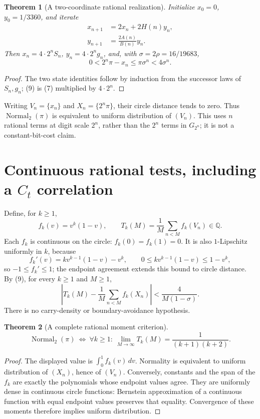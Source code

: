 \documentclass[10pt,a4paper]{article}
\newtheorem{theorem}{Theorem}[section]
\newcommand{\Q}{\mathbb Q}\newcommand{\R}{\mathbb R}
\newcommand{\fracp}[1]{\{#1\}}
\newcommand{\Normal}{\operatorname{Normal}_2}
\newcommand{\av}[2]{\frac1{#1}\sum_{n<#1}#2}
\begin{document}
\begin{theorem}[A two-coordinate rational realization]
Initialize $x_0=0$, $y_0=1/3360$, and iterate
\[
 \boxed{\begin{aligned}
 x_{n+1}&=2x_n+2H(n)y_n,\\
 y_{n+1}&=\frac{2A(n)}{B(n)}y_n.
 \end{aligned}}                                               \tag{8}
\]
Then $x_n=4\cdot2^nS_n$, $y_n=4\cdot2^ng_n$, and, with
$\sigma=2\rho=16/19683$,
\[
 0<2^n\pi-x_n\le\pi\sigma^n<4\sigma^n.                    \tag{9}
\]
\end{theorem}
\begin{proof}
The two state identities follow by induction from the successor laws of $S_n,g_n$; (9) is (7) multiplied by $4\cdot2^n$.
\end{proof}
Writing $V_n=\fracp{x_n}$ and $X_n=\fracp{2^n\pi}$, their circle distance tends to zero. Thus $\Normal(\pi)$ is equivalent to uniform distribution of $(V_n)$. This uses $n$ rational terms at digit scale $2^n$, rather than the $2^n$ terms in $G_{2^n}$; it is not a constant-bit-cost claim.

\newpage
\section{Continuous rational tests, including a \texorpdfstring{$C_t$}{C_t} correlation}
Define, for $k\ge1$,
\[
 f_k(v)=v^k(1-v),\qquad
 T_k(M)=\av{M}{f_k(V_n)}\in\Q.
\]
Each $f_k$ is continuous on the circle: $f_k(0)=f_k(1)=0$.
It is also $1$-Lipschitz uniformly in $k$, because
\[
 f_k'(v)=kv^{k-1}(1-v)-v^k,\qquad
 0\le kv^{k-1}(1-v)\le1-v^k,
\]
so $-1\le f_k'\le1$; the endpoint agreement extends this bound to circle distance.
By (9), for every $k\ge1$ and $M\ge1$,
\[
 \boxed{\left|T_k(M)-\av{M}{f_k(X_n)}\right|
 <\frac4{M(1-\sigma)}.}                                      \tag{10}
\]
There is no carry-density or boundary-avoidance hypothesis.

\begin{theorem}[A complete rational moment criterion]
\[
 \boxed{\Normal(\pi)\ \Longleftrightarrow\
 \forall k\ge1:\ \lim_{M\to\infty}T_k(M)
       =\frac1{(k+1)(k+2)}.}                                  \tag{11}
\]
\end{theorem}
\begin{proof}
The displayed value is $\int_0^1f_k(v)\,dv$. Normality is equivalent to uniform distribution of $(X_n)$, hence of $(V_n)$. Conversely, constants and the span of the $f_k$ are exactly the polynomials whose endpoint values agree. They are uniformly dense in continuous circle functions: Bernstein approximation of a continuous function with equal endpoint values preserves that equality. Convergence of these moments therefore implies uniform distribution.
\end{proof}
\end{document}
